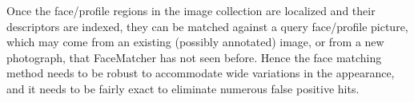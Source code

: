 

\begin{xpsectionbox}{}{}

Once the face/profile regions in the image collection are localized and their descriptors are indexed, they can be matched against a query face/profile picture, which may come from an existing (possibly annotated) image, or from a new photograph, that FaceMatcher has not seen before. Hence the face matching method needs to be robust to accommodate wide variations in the appearance, and it needs to be fairly exact to eliminate numerous false positive hits.

%
%
%
\end{xpsectionbox}

%
%

